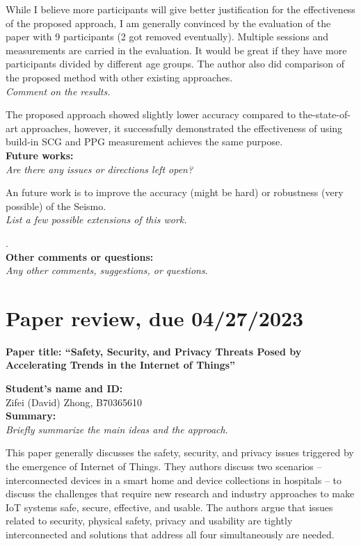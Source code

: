\documentclass[11pt, oneside]{article}   	%
\begin{document}
While I believe more participants will give better justification for the effectiveness of the proposed approach, I am generally convinced by the evaluation of the paper with 9 participants (2 got removed eventually). Multiple sessions and measurements are carried in the evaluation. It would be great if they have more participants divided by different age groups. The author also did comparison of the proposed method with other existing approaches.\\

\noindent \emph{Comment on the results.}

The proposed approach showed slightly lower accuracy compared to the-state-of-art approaches, however, it successfully demonstrated the effectiveness of using build-in SCG and PPG measurement achieves the same purpose.\\


\noindent \textbf{Future works:}\\
\emph{Are there any issues or directions left open?}

An future work is to improve the accuracy (might be hard) or robustness (very possible) of the Seismo. \\

\noindent \emph{List a few possible extensions of this work.}

. \\


\noindent \textbf{Other comments or questions:}\\
\emph{Any other comments, suggestions, or questions}.


\newpage
\section{Paper review, due 04/27/2023}
\begin{center}
\noindent
\textbf{\Large Paper title: ``Safety, Security, and Privacy Threats Posed by Accelerating Trends in the Internet of Things''}
\end{center}
\noindent \textbf{Student's name and ID: }\\
Zifei (David) Zhong, B70365610\\

\noindent \textbf{Summary:}\\
\emph{Briefly summarize the main ideas and the approach}.

This paper generally discusses the safety, security, and privacy issues triggered by the emergence of Internet of Things. They authors discuss two scenarios -- interconnected devices in a smart home and device collections in hospitals -- to discuss the challenges that require new research and industry approaches to make IoT systems safe, secure, effective, and usable. The authors argue that issues related to security, physical safety, privacy and usability are tightly interconnected and solutions that address all four simultaneously are needed.  \\
\end{document}
